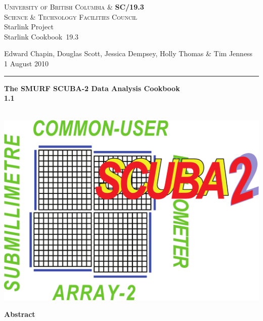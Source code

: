 \documentclass[twoside,11pt]{article}
\newcommand{\stardoccategory}  {Starlink Cookbook}
\newcommand{\stardocinitials}  {SC}
\newcommand{\stardocnumber}    {19.3}
\newcommand{\stardocauthors}   {Edward Chapin, Douglas Scott, Jessica
  Dempsey, Holly Thomas \& Tim Jenness}
\newcommand{\stardocdate}      {1 August 2010}
\newcommand{\stardoctitle}     {The SMURF SCUBA-2 Data Analysis Cookbook}
\newcommand{\stardocversion}   {1.1}
\newcommand{\stardocmanual}    {\ }
\newcommand{\stardocname}{\stardocinitials /\stardocnumber}
\newenvironment{latexonly}{}{}
\renewcommand{\_}{\texttt{\symbol{95}}}
\begin{document}
\thispagestyle{empty}

\begin{latexonly}
   \textsc{University of British Columbia \&} \hfill \textbf{\stardocname}\\
   {\textsc{Science \& Technology Facilities Council}}\\
   {\large Starlink Project\\}
   {\large \stardoccategory\ \stardocnumber}
   \begin{flushright}
   \stardocauthors\\
   \stardocdate
   \end{flushright}
   \vspace{-4mm}
   \rule{\textwidth}{0.5mm}
   \vspace{5mm}
   \begin{center}
   {\Huge\textbf{\stardoctitle \\ [2.5ex]}}
   {\LARGE\textbf{\stardocversion \\ [4ex]}}
   {\Huge\textbf{\stardocmanual}}
   \end{center}
   \vspace{5mm}

\begin{center}
\hspace{1.3in}\includegraphics[scale=0.3]{sc19_logo}
\end{center}

   \vspace{10mm}
   \begin{center}
      {\Large\textbf{Abstract}}
   \end{center}
\end{latexonly}
\end{document}
